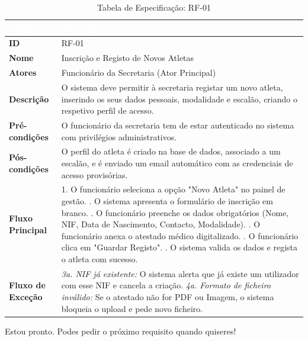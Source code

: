 \documentclass[a4paper,12pt]{scrreprt}
\begin{document}
{{
\begin{table}[H]
\centering
\begin{tabularx}{\textwidth}{|l|X|}
\hline
\rowcolor{headerblue}\textcolor{white}{\textbf{Campo}} & \textcolor{white}{\textbf{Descrição}} \\ \hline
\textbf{ID} & RF-01 \\ \hline
\textbf{Nome} & Inscrição e Registo de Novos Atletas \\ \hline
\textbf{Atores} & Funcionário da Secretaria (Ator Principal) \\ \hline
\textbf{Descrição} & O sistema deve permitir à secretaria registar um novo atleta, inserindo os seus dados pessoais, modalidade e escalão, criando o respetivo perfil de acesso. \\ \hline
\textbf{Pré-condições} & O funcionário da secretaria tem de estar autenticado no sistema com privilégios administrativos. \\ \hline
\textbf{Pós-condições} & O perfil do atleta é criado na base de dados, associado a um escalão, e é enviado um email automático com as credenciais de acesso provisórias. \\ \hline
\textbf{Fluxo Principal} & 
1. O funcionário seleciona a opção "Novo Atleta" no painel de gestão. \newline
2. O sistema apresenta o formulário de inscrição em branco. \newline
3. O funcionário preenche os dados obrigatórios (Nome, NIF, Data de Nascimento, Contacto, Modalidade). \newline
4. O funcionário anexa o atestado médico digitalizado. \newline
5. O funcionário clica em "Guardar Registo". \newline
6. O sistema valida os dados e regista o atleta com sucesso. \\ \hline
\textbf{Fluxo de Exceção} & 
\textit{3a. NIF já existente:} O sistema alerta que já existe um utilizador com esse NIF e cancela a criação. \newline
\textit{4a. Formato de ficheiro inválido:} Se o atestado não for PDF ou Imagem, o sistema bloqueia o upload e pede novo ficheiro. \\ \hline
\end{tabularx}
\caption{Tabela de Especificação: RF-01}
\end{table}

Estou pronto. Podes pedir o próximo requisito quando quiseres!

}}
\end{document}
